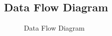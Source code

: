 \documentclass[oneside,a4paper,12pt]{book}
\begin{document}
\subsection{Data Flow Diagram}  
\begin{center}
    \begin{figure}[!htbp]
        \centering
      \caption{Data Flow Diagram}
      \label{fig:usecase}
    \end{figure}
\end{center}  
\end{document}
